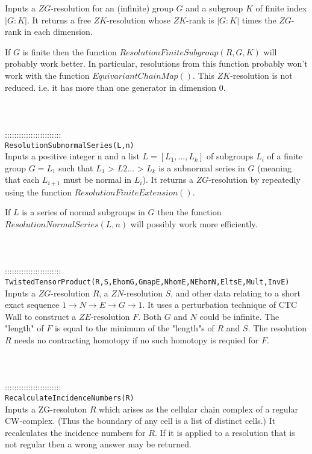 \documentclass[a4paper,11pt]{report}
\begin{document}
{ Inputs a $ZG$-resolution for an (infinite) group $G$ and a subgroup $K$ of finite index $|G:K|$. It returns a free $ZK$-resolution whose $ZK$-rank is $|G:K|$ times the $ZG$-rank in each dimension.

 If $G$ is finite then the function $ResolutionFiniteSubgroup(R,G,K)$ will probably work better. In particular, resolutions from this function
probably won't work with the function $EquivariantChainMap()$. This $ZK$-resolution is not reduced. i.e. it has more than one generator in dimension
0. \\
 \\
 \\
 \\
 ::::::::::::::::::::::::\\
 \texttt{ResolutionSubnormalSeries(L,n) }\\
 

 Inputs a positive integer n and a list $L = [L_1 , \ldots , L_k]$ of subgroups $L_i$ of a finite group $G=L_1$ such that $L_1$ {\textgreater} $L2 \ldots $ {\textgreater} $L_k$ is a subnormal series in $G$ (meaning that each $L_{i+1}$ must be normal in $L_i$). It returns a $ZG$-resolution by repeatedly using the function $ResolutionFiniteExtension()$.

 If $L$ is a series of normal subgroups in $G$ then the function $ResolutionNormalSeries(L,n)$ will possibly work more efficiently. \\
 \\
 \\
 \\
 ::::::::::::::::::::::::\\
 \texttt{TwistedTensorProduct(R,S,EhomG,GmapE,NhomE,NEhomN,EltsE,Mult,InvE)}\\
 

 Inputs a $ZG$-resolution $R$, a $ZN$-resolution $S$, and other data relating to a short exact sequence $1 \longrightarrow N \longrightarrow E \longrightarrow G \longrightarrow 1$. It uses a perturbation technique of CTC Wall to construct a $ZE$-resolution $F$. Both $G$ and $N$ could be infinite. The "length" of $F$ is equal to the minimum of the "length"s of $R$ and $S$. The resolution $R$ needs no contracting homotopy if no such homotopy is requied for $F$. \\
 \\
 \\
 \\
 ::::::::::::::::::::::::\\
 \texttt{RecalculateIncidenceNumbers(R)}\\
 

 Inputs a ZG-resoluton $R$ which arises as the cellular chain complex of a regular CW-complex. (Thus the
boundary of any cell is a list of distinct cells.) It recalculates the
incidence numbers for $R$. If it is applied to a resolution that is not regular then a wrong answer may
be returned. \\
 \\
 \\
 }
\end{document}
